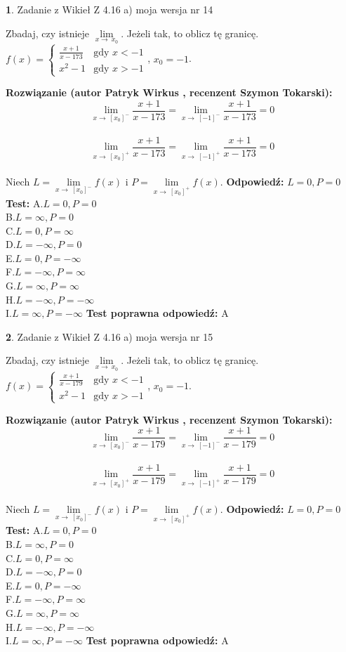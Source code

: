 \documentclass[12pt, a4paper]{article}
\theoremstyle{definition} %
\newtheorem{zad}{}
\newcommand{\zadStart}[1]{\begin{zad}#1\newline}
\newcommand{\zadStop}{\end{zad}}
\newcommand{\rozwStart}[2]{\noindent \textbf{Rozwiązanie (autor #1 , recenzent #2): }\newline}
\newcommand{\rozwStop}{\newline}
\newcommand{\odpStart}{\noindent \textbf{Odpowiedź:}\newline}
\newcommand{\odpStop}{\newline}
\newcommand{\testStart}{\noindent \textbf{Test:}\newline}
\newcommand{\testStop}{\newline}
\newcommand{\kluczStart}{\noindent \textbf{Test poprawna odpowiedź:}\newline}
\newcommand{\kluczStop}{\newline}
\begin{document}
\zadStart{Zadanie z Wikieł Z 4.16 a) moja wersja nr 14}

Zbadaj, czy istnieje $\lim\limits_{x\to\ x_{0}}$. Jeżeli tak, to oblicz tę granicę.\\   $f(x) = \left\{ \begin{array}{ll}
\frac{x+1}{x-173} & \textrm{gdy $x<-1$}\\
x^{2}-1 & \textrm{gdy $x>-1$}
\end{array} \right.$, $x_{0}=-1$.
\zadStop
\rozwStart{Patryk Wirkus}{Szymon Tokarski}
$$\lim\limits_{x\to\ [x_{0}]^{-}}\frac{x+1}{x-173} = \lim\limits_{x\to\ [-1]^{-}}\frac{x+1}{x-173} = 0$$
\\
$$\lim\limits_{x\to\ [x_{0}]^{+}}\frac{x+1}{x-173} = \lim\limits_{x\to\ [-1]^{+}}\frac{x+1}{x-173} = 0$$
\\
Niech $L=\lim\limits_{x\to\ [x_{0}]^{-}}f(x)$ i $P=\lim\limits_{x\to\ [x_{0}]^{+}}f(x)$.
\rozwStop
\odpStart
$L=0, P=0$
\odpStop
\testStart
A.$L=0, P=0$\\ B.$L=\infty, P=0$\\ C.$L=0, P=\infty$\\ D.$L=-\infty, P=0$\\ E.$L=0, P=-\infty$\\
F.$L=-\infty, P=\infty$\\ G.$L=\infty, P=\infty$\\
H.$L=-\infty, P=-\infty$\\
I.$L=\infty, P=-\infty$
\testStop
\kluczStart
A
\kluczStop



\zadStart{Zadanie z Wikieł Z 4.16 a) moja wersja nr 15}

Zbadaj, czy istnieje $\lim\limits_{x\to\ x_{0}}$. Jeżeli tak, to oblicz tę granicę.\\   $f(x) = \left\{ \begin{array}{ll}
\frac{x+1}{x-179} & \textrm{gdy $x<-1$}\\
x^{2}-1 & \textrm{gdy $x>-1$}
\end{array} \right.$, $x_{0}=-1$.
\zadStop
\rozwStart{Patryk Wirkus}{Szymon Tokarski}
$$\lim\limits_{x\to\ [x_{0}]^{-}}\frac{x+1}{x-179} = \lim\limits_{x\to\ [-1]^{-}}\frac{x+1}{x-179} = 0$$
\\
$$\lim\limits_{x\to\ [x_{0}]^{+}}\frac{x+1}{x-179} = \lim\limits_{x\to\ [-1]^{+}}\frac{x+1}{x-179} = 0$$
\\
Niech $L=\lim\limits_{x\to\ [x_{0}]^{-}}f(x)$ i $P=\lim\limits_{x\to\ [x_{0}]^{+}}f(x)$.
\rozwStop
\odpStart
$L=0, P=0$
\odpStop
\testStart
A.$L=0, P=0$\\ B.$L=\infty, P=0$\\ C.$L=0, P=\infty$\\ D.$L=-\infty, P=0$\\ E.$L=0, P=-\infty$\\
F.$L=-\infty, P=\infty$\\ G.$L=\infty, P=\infty$\\
H.$L=-\infty, P=-\infty$\\
I.$L=\infty, P=-\infty$
\testStop
\kluczStart
A
\kluczStop
\end{document}
